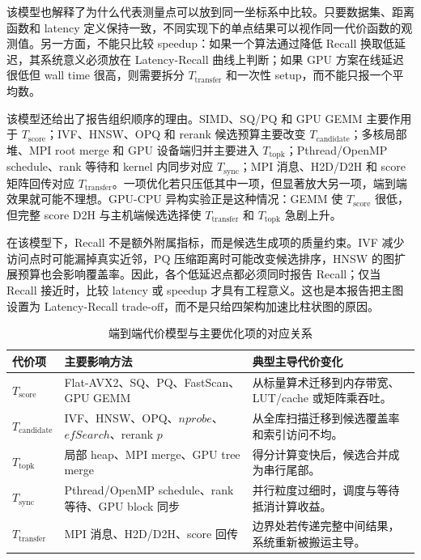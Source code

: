 \documentclass[a4paper,11pt,UTF8]{ctexart}
\begin{document}
该模型也解释了为什么代表测量点可以放到同一坐标系中比较。只要数据集、距离函数和 latency 定义保持一致，不同实现下的单点结果可以视作同一代价函数的观测值。另一方面，不能只比较 speedup：如果一个算法通过降低 Recall 换取低延迟，其系统意义必须放在 Latency-Recall 曲线上判断；如果 GPU 方案在线延迟很低但 wall time 很高，则需要拆分 $T_{\mathrm{transfer}}$ 和一次性 setup，而不能只报一个平均数。

该模型还给出了报告组织顺序的理由。SIMD、SQ/PQ 和 GPU GEMM 主要作用于 $T_{\mathrm{score}}$；IVF、HNSW、OPQ 和 rerank 候选预算主要改变 $T_{\mathrm{candidate}}$；多核局部堆、MPI root merge 和 GPU 设备端归并主要进入 $T_{\mathrm{topk}}$；Pthread/OpenMP schedule、rank 等待和 kernel 内同步对应 $T_{\mathrm{sync}}$；MPI 消息、H2D/D2H 和 score 矩阵回传对应 $T_{\mathrm{transfer}}$。一项优化若只压低其中一项，但显著放大另一项，端到端效果就可能不理想。GPU-CPU 异构实验正是这种情况：GEMM 使 $T_{\mathrm{score}}$ 很低，但完整 score D2H 与主机端候选选择使 $T_{\mathrm{transfer}}$ 和 $T_{\mathrm{topk}}$ 急剧上升。

在该模型下，Recall 不是额外附属指标，而是候选生成项的质量约束。IVF 减少访问点时可能漏掉真实近邻，PQ 压缩距离时可能改变候选排序，HNSW 的图扩展预算也会影响覆盖率。因此，各个低延迟点都必须同时报告 Recall；仅当 Recall 接近时，比较 latency 或 speedup 才具有工程意义。这也是本报告把主图设置为 Latency-Recall trade-off，而不是只给四架构加速比柱状图的原因。

\begin{table}[H]
  \centering\footnotesize
  \begin{tabularx}{\textwidth}{p{2.7cm}p{3.7cm}Y}
    \toprule
    代价项 & 主要影响方法 & 典型主导代价变化 \\
    \midrule
    $T_{\mathrm{score}}$ & Flat-AVX2、SQ、PQ、FastScan、GPU GEMM & 从标量算术迁移到内存带宽、LUT/cache 或矩阵乘吞吐。 \\
    $T_{\mathrm{candidate}}$ & IVF、HNSW、OPQ、$nprobe$、$efSearch$、rerank $p$ & 从全库扫描迁移到候选覆盖率和索引访问不均。 \\
    $T_{\mathrm{topk}}$ & 局部 heap、MPI merge、GPU tree merge & 得分计算变快后，候选合并成为串行尾部。 \\
    $T_{\mathrm{sync}}$ & Pthread/OpenMP schedule、rank 等待、GPU block 同步 & 并行粒度过细时，调度与等待抵消计算收益。 \\
    $T_{\mathrm{transfer}}$ & MPI 消息、H2D/D2H、score 回传 & 边界处若传递完整中间结果，系统重新被搬运主导。 \\
    \bottomrule
  \end{tabularx}
  \caption{端到端代价模型与主要优化项的对应关系}
  \label{tab:cost-model-map}
\end{table}
\end{document}

